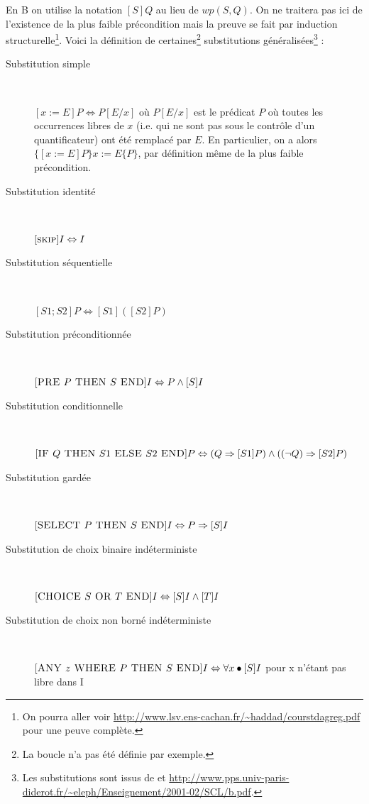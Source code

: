 \documentclass[10pt,a4paper]{article}
\begin{document}
En B on utilise la notation $[S]Q$ au lieu de $wp(S, Q)$. On ne traitera pas ici de l'existence de la plus faible précondition mais la preuve se fait par induction structurelle\footnote{On pourra aller voir \url{http://www.lsv.ens-cachan.fr/~haddad/courstdagreg.pdf} pour une peuve complète.}. Voici la définition de certaines\footnote{La boucle n'a pas été définie par exemple.} substitutions généralisées\footnote{Les substitutions sont issus de \cite{habrias2006specifications} et \url{http://www.pps.univ-paris-diderot.fr/~eleph/Enseignement/2001-02/SCL/b.pdf}.} :
\begin{description}
\item[Substitution simple] ~

$[ x := E ]P \Leftrightarrow P[E/x]$ où $P[E/x]$ est le prédicat $P$ où toutes les occurrences libres de $x$ (i.e. qui ne sont pas sous le contrôle d'un quantificateur) ont été remplacé par $E$. En particulier, on a alors $\{ [x := E ]P \} x := E\{ P\}$, par définition même de la plus faible précondition.
\item[Substitution identité]  ~

$[\textsc{skip}]I \Leftrightarrow I$
\item[Substitution séquentielle]  ~

$[S1;S2]P 	\Leftrightarrow [S1]([S2]P)$
\item[Substitution préconditionnée]  ~

$[\textsc{PRE } P \textsc{ THEN } S \textsc{ END}]I \Leftrightarrow P \wedge [S]I$
\item[Substitution conditionnelle]  ~

$[\textsc{IF } Q \textsc{ THEN } S1 \textsc{ ELSE } S2 \textsc{ END}]P \Leftrightarrow (Q \Rightarrow [S1]P) \wedge( (\lnot Q)\Rightarrow [S2]P)$
\item[Substitution gardée]  ~

$[\textsc{SELECT } P \textsc{ THEN } S \textsc{ END}]I \Leftrightarrow P \Rightarrow [S]I$
\item[Substitution de choix binaire indéterministe]  ~

$[\textsc{CHOICE } S \textsc{ OR } T \textsc{ END}]I \Leftrightarrow [S]I \wedge [T ]I$
\item[Substitution de choix non borné indéterministe] ~

$[\textsc{ANY } z \textsc{ WHERE } P \textsc{ THEN } S \textsc{ END}]I \Leftrightarrow \forall x \bullet [S]I$ pour x n'étant pas libre dans I
\end{description}
\end{document}
